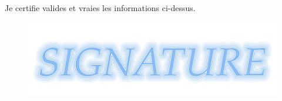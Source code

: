 \documentclass[11pt, a4paper]{awesome-cv} %
\begin{document}
\newpage



%
%
%
%
%


\vspace{3cm}%
\begin{flushleft}
Je certifie valides et vraies les informations ci-dessus.
\end{flushleft}
\begin{figure}[!h]
\begin{flushright}
\includegraphics[scale=0.2]{sign}
\end{flushright}
\end{figure}





\end{document}
